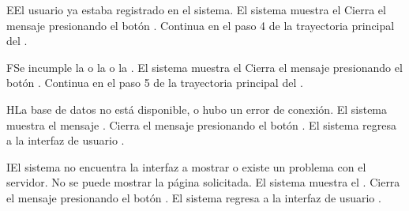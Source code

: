 \begin{UCtrayectoriaA}{E}{El usuario ya estaba registrado en el sistema.}
	\UCpaso El sistema muestra el  
	\UCpaso[\UCactor] Cierra el mensaje presionando el botón .
	\UCpaso Continua en el paso 4 de la trayectoria principal del .
\end{UCtrayectoriaA}

\begin{UCtrayectoriaA}{F}{Se incumple la  o la   o la   .}
	\UCpaso El sistema muestra el 
	\UCpaso[\UCactor] Cierra el mensaje presionando el botón .
	\UCpaso Continua en el paso 5 de la trayectoria principal del .
\end{UCtrayectoriaA}



\begin{UCtrayectoriaA}{H}{La base de datos no está disponible, o hubo un error de conexión.}
	\UCpaso El sistema muestra el mensaje .
	\UCpaso[\UCactor] Cierra el mensaje presionando el botón .
	\UCpaso El sistema regresa a la interfaz de usuario .
\end{UCtrayectoriaA}

\begin{UCtrayectoriaA}{I}{El sistema no encuentra la interfaz a mostrar o existe un problema con el servidor.}
	\UCpaso No se puede mostrar la página solicitada.
	\UCpaso El sistema muestra el .
	\UCpaso[\UCactor] Cierra el mensaje presionando el botón .
	\UCpaso El sistema regresa a la interfaz de usuario .
\end{UCtrayectoriaA}
